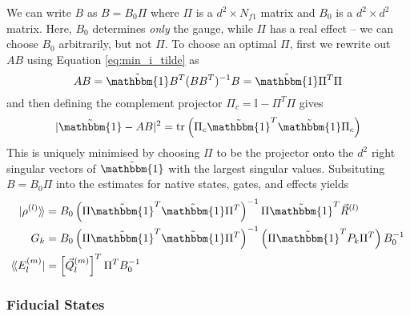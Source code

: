We can write $B$ as $B = B_0 \Pi$ where $\Pi$ is a $d^2 \times N_{f1}$ matrix and $B_0$ is a $d^2
\times d^2$ matrix. Here, $B_0$ determines \textit{only} the gauge, while $\Pi$ has a real effect --
we can choose $B_0$ arbitrarily, but not $\Pi$. To choose an optimal $\Pi$, first we rewrite out
$AB$ using Equation \ref{eq:min_i_tilde} as
\begin{equation}
    AB = \tilde{\mathbbm{1}} B^T (B B^T)^{-1} B = \tilde{\mathbbm{1}} \Pi^T \Pi
\end{equation}
and then defining the complement projector $\Pi_c = \mathbb{I} - \Pi^T \Pi$ gives
\begin{equation}
    |\tilde{\mathbbm{1}} - AB|^2 = \tr{\Pi_c \tilde{\mathbbm{1}}^T \tilde{\mathbbm{1}} \Pi_c}
\end{equation}
This is uniquely minimised by choosing $\Pi$ to be the projector onto the $d^2$ right singular
vectors of $\tilde{\mathbbm{1}}$ with the largest singular values. Subsituting $B = B_0 \Pi$ into
the estimates for native states, gates, and effects yields
\begin{align}
    \superket{\rho^{(l)}} &= B_0 \left(\Pi \tilde{\mathbbm{1}}^T \tilde{\mathbbm{1}} \Pi^T \right)^{-1} \Pi \tilde{\mathbbm{1}}^T \vec{R}^{(l)} \\
    G_k                   &= B_0 \left(\Pi \tilde{\mathbbm{1}}^T \tilde{\mathbbm{1}} \Pi^T \right)^{-1} \left(\Pi \tilde{\mathbbm{1}}^T P_k \Pi^T \right) B_0^{-1} \\
    \superbra{E_l^{(m)}}  &= \left[\vec{Q}_l^{(m)}\right]^T \Pi^T B_0^{-1}
\end{align}

\subsubsection{Fiducial States}


